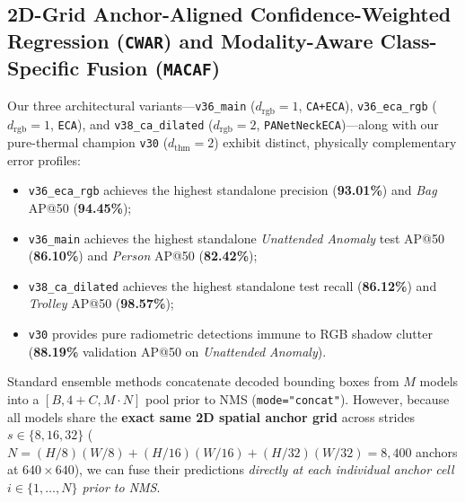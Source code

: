 \documentclass[journal,twoside,web]{ieeecolor}
\begin{document}
\subsection{2D-Grid Anchor-Aligned Confidence-Weighted Regression (\texttt{CWAR}) and Modality-Aware Class-Specific Fusion (\texttt{MACAF})}
Our three architectural variants---\texttt{v36\_main} ($d_{\text{rgb}}=1$, \texttt{CA+ECA}), \texttt{v36\_eca\_rgb} ($d_{\text{rgb}}=1$, \texttt{ECA}), and \texttt{v38\_ca\_dilated} ($d_{\text{rgb}}=2$, \texttt{PANetNeckECA})---along with our pure-thermal champion \texttt{v30} ($d_{\text{thm}}=2$) exhibit distinct, physically complementary error profiles:
\begin{itemize}
    \item \texttt{v36\_eca\_rgb} achieves the highest standalone precision (\textbf{93.01\%}) and \textit{Bag} AP@50 (\textbf{94.45\%});
    \item \texttt{v36\_main} achieves the highest standalone \textit{Unattended Anomaly} test AP@50 (\textbf{86.10\%}) and \textit{Person} AP@50 (\textbf{82.42\%});
    \item \texttt{v38\_ca\_dilated} achieves the highest standalone test recall (\textbf{86.12\%}) and \textit{Trolley} AP@50 (\textbf{98.57\%});
    \item \texttt{v30} provides pure radiometric detections immune to RGB shadow clutter (\textbf{88.19\%} validation AP@50 on \textit{Unattended Anomaly}).
\end{itemize}

Standard ensemble methods concatenate decoded bounding boxes from $M$ models into a $[B, 4+C, M\cdot N]$ pool prior to NMS (\texttt{mode="concat"}). However, because all models share the \textbf{exact same 2D spatial anchor grid} across strides $s \in \{8, 16, 32\}$ ($N = (H/8)(W/8) + (H/16)(W/16) + (H/32)(W/32) = 8{,}400$ anchors at $640\times 640$), we can fuse their predictions \emph{directly at each individual anchor cell $i \in \{1,\dots,N\}$ prior to NMS}.
\end{document}
